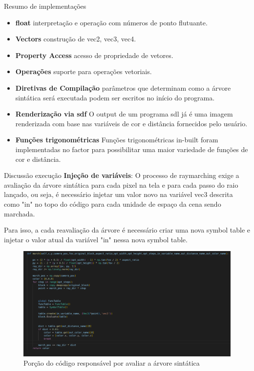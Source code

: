 \documentclass[2pt]{beamer} %
\begin{document}
\begin{frame}{Resumo de implementações}
\begin{itemize}
\item \textbf{float} interpretação e operação com números de ponto flutuante.
\item \textbf{Vectors} construção de vec2, vec3, vec4.
\item \textbf{Property Access} acesso de propriedade de vetores.
\item \textbf{Operações} suporte para operações vetoriais.
\item \textbf{Diretivas de Compilação} parâmetros que determinam como a árvore sintática será executada podem ser escritos no início do programa.
\item \textbf{Renderização via sdf} O output de um programa sdl já é uma imagem renderizada com base nas variáveis de cor e distância fornecidos pelo usuário.
\item \textbf{Funções trigonométricas} Funções trigonométricas in-built foram implementadas no factor para possibilitar uma maior variedade de funções de cor e distância.

\end{itemize}
\end{frame}

\begin{frame}{Discussão execução}
    \textbf{Injeção de variáveis}: O processo de raymarching exige a avaliação da árvore sintática para cada pixel na tela e para cada passo do raio lançado,
    ou seja, é necessário injetar um valor novo na variável vec3 descrita como "in" no topo do código para cada unidade de espaço da cena sendo marchada.

    Para isso, a cada reavaliação da árvore é necessário criar uma nova symbol table e injetar o valor atual da variável "in" nessa nova symbol table.

    \begin{figure}
        \centering
        \includegraphics[width=0.65\linewidth]{imgs/march_code.png}
        \caption{Porção do código responsável por avaliar a árvore sintática}
        \label{fig:enter-label}
    \end{figure}
        
\end{frame}
\end{document}
